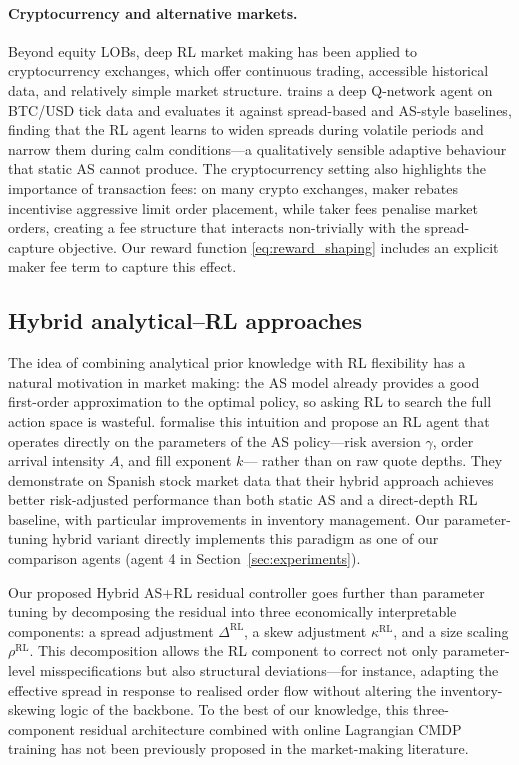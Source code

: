 \documentclass[11pt]{article}
\begin{document}
\paragraph{Cryptocurrency and alternative markets.}
Beyond equity LOBs, deep RL market making has been applied to
cryptocurrency exchanges, which offer continuous trading, accessible
historical data, and relatively simple market structure.
\textcite{sadighian2019crypto} trains a deep Q-network agent on
BTC/USD tick data and evaluates it against spread-based and
AS-style baselines, finding that the RL agent learns to widen spreads
during volatile periods and narrow them during calm conditions---a
qualitatively sensible adaptive behaviour that static AS cannot produce.
The cryptocurrency setting also highlights the importance of transaction
fees: on many crypto exchanges, maker rebates incentivise aggressive
limit order placement, while taker fees penalise market orders, creating
a fee structure that interacts non-trivially with the spread-capture
objective.
Our reward function \eqref{eq:reward_shaping} includes an explicit maker
fee term to capture this effect.

\subsection{Hybrid analytical--RL approaches}

The idea of combining analytical prior knowledge with RL flexibility has
a natural motivation in market making: the AS model already provides
a good first-order approximation to the optimal policy, so asking RL
to search the full action space is wasteful.
\textcite{falces2022asrl} formalise this intuition and propose an RL
agent that operates directly on the parameters of the AS policy---risk
aversion $\gamma$, order arrival intensity $A$, and fill exponent $k$---
rather than on raw quote depths.
They demonstrate on Spanish stock market data that their hybrid approach
achieves better risk-adjusted performance than both static AS and a
direct-depth RL baseline, with particular improvements in inventory
management.
Our parameter-tuning hybrid variant directly implements this paradigm as
one of our comparison agents (agent 4 in Section~\ref{sec:experiments}).

Our proposed Hybrid AS+RL residual controller goes further than parameter
tuning by decomposing the residual into three economically interpretable
components: a spread adjustment $\Delta^{\text{RL}}$, a skew adjustment
$\kappa^{\text{RL}}$, and a size scaling $\rho^{\text{RL}}$.
This decomposition allows the RL component to correct not only
parameter-level misspecifications but also structural deviations---for
instance, adapting the effective spread in response to realised order
flow without altering the inventory-skewing logic of the backbone.
To the best of our knowledge, this three-component residual architecture
combined with online Lagrangian CMDP training has not been previously
proposed in the market-making literature.
\end{document}
